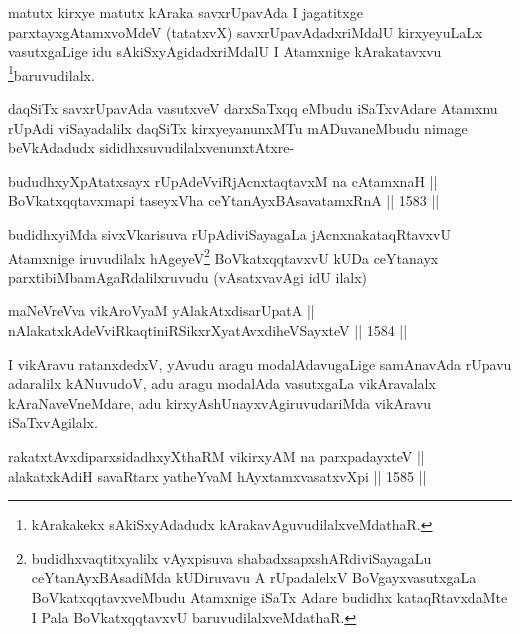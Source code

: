 \begin{artha}
matutx kirxye matutx kAraka savxrUpavAda I jagatitxge parxtayxgAtamxvoMdeV (tatatxvX) savxrUpavAdadxriMdalU kirxyeyuLaLx vasutxgaLige idu sAkiSxyAgidadxriMdalU I Atamxnige kArakatavxvu \footnote{kArakakekx sAkiSxyAdadudx kArakavAguvudilalxveMdathaR.}baruvudilalx.
\end{artha}

\begin{artha}
daqSiTx savxrUpavAda vasutxveV darxSaTxqq eMbudu iSaTxvAdare Atamxnu rUpAdi viSayadalilx daqSiTx kirxyeyanunxMTu mADuvaneMbudu nimage beVkAdadudx sididhxsuvudilalxvenunxtAtxre-
\end{artha}

\begin{shl}
bududhxyXpAtatxsayx rUpAdeVviRjAcnxtaqtavxM na cA\s \s tamxnaH || \\
BoVkatxqqtavxmapi taseyxVha ceYtanAyxBAsavatamxRnA \hfill || 1583 ||  
\end{shl}

\begin{artha}
budidhxyiMda sivxVkarisuva rUpAdiviSayagaLa jAcnxnakataqRtavxvU Atamxnige iruvudilalx hAgeyeV\footnote{budidhxvaqtitxyalilx vAyxpisuva shabadxsapxshARdiviSayagaLu ceYtanAyxBAsadiMda kUDiruvavu A rUpadalelxV BoVgayxvasutxgaLa BoVkatxqqtavxveMbudu Atamxnige iSaTx Adare budidhx kataqRtavxdaMte I Pala BoVkatxqqtavxvU baruvudilalxveMdathaR.} BoVkatxqqtavxvU kUDa ceYtanayx parxtibiMbamAgaRdalilxruvudu (vAsatxvavAgi idU ilalx)
\end{artha}


\begin{shl}
maNeVreVva vikAroV\s yaM yA\s lakAtxdisarUpatA || \\
nAlakatxkAdeVviRkaqtiniRSikxrXyatAvxdiheVSayxteV \hfill || 1584 ||  
\end{shl}

\begin{artha}
I vikAravu ratanxdedxV, yAvudu aragu modalAdavugaLige samAnavAda rUpavu adaralilx kANuvudoV, adu aragu modalAda vasutxgaLa vikAravalalx kAraNaveVneMdare, adu kirxyAshUnayxvAgiruvudariMda vikAravu iSaTxvAgilalx.
\end{artha}


\begin{shl}
rakatxtAvxdiparxsidadhxyXthaRM vikirxyAM na parxpadayxteV || \\
alakatxkAdiH savaRtarx yatheYvaM hAyxtamxvasatxvXpi \hfill || 1585 ||  
\end{shl}

